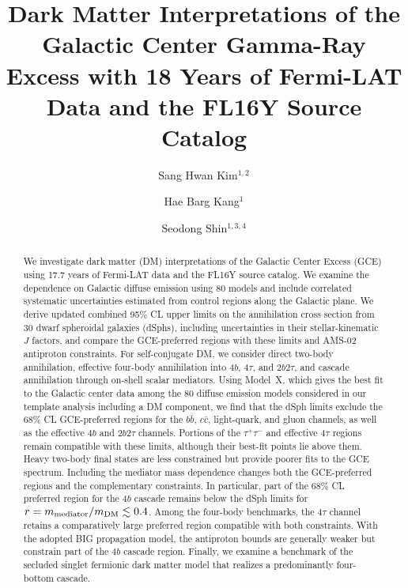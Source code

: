 \documentclass[superscriptaddress,
showpacs,preprintnumbers,nofootinbib,eqsecnum,amsmath,amssymb,aps,11pt, groupedaddress, floatfix]{revtex4-2}
\begin{document}


\title{\large \bf Dark Matter Interpretations of the Galactic Center Gamma-Ray Excess with 18 Years of Fermi-LAT Data and the FL16Y Source Catalog} 


\author{Sang Hwan Kim$^{1,2}$}

\author{Hae Barg Kang$^1$} 

\author{Seodong Shin$^{1,3,4}$}





\begin{abstract}
We investigate dark matter (DM) interpretations of the Galactic
Center Excess (GCE) using 17.7 years of Fermi-LAT data and the FL16Y source catalog. 
We examine the dependence on Galactic
diffuse emission using 80 models and include correlated systematic uncertainties estimated from control regions along the Galactic plane. 
We derive updated combined 95\% CL upper limits on the annihilation cross section from 30 dwarf spheroidal galaxies (dSphs), including uncertainties in their stellar-kinematic $J$ factors, and compare the GCE-preferred regions with these limits and AMS-02 antiproton constraints.
For self-conjugate DM, we consider direct two-body annihilation, effective four-body annihilation into $4b$, $4\tau$, and $2b2\tau$,
and cascade annihilation through on-shell scalar mediators.
Using Model~X, which gives the best fit to the Galactic center
data among the 80 diffuse emission models considered in our
template analysis including a DM component, we find that the
dSph limits exclude the 68\% CL GCE-preferred regions for the
$b\bar b$, $c\bar c$, light-quark, and gluon channels, as well
as the effective $4b$ and $2b2\tau$ channels.
Portions of the $\tau^+\tau^-$ and effective $4\tau$ regions remain compatible with these limits, although their best-fit points lie above them. Heavy two-body final states are less constrained but provide poorer fits to the GCE spectrum.
Including the mediator mass dependence changes both the
GCE-preferred regions and the complementary constraints.
In particular, part of the 68\% CL preferred region for the $4b$ cascade remains below the dSph limits for $r=m_{\rm mediator}/m_{\rm DM} \lesssim 0.4$.
Among the four-body benchmarks, the $4\tau$ channel retains a comparatively large preferred region compatible with both constraints. With the adopted BIG propagation model, the antiproton bounds are generally weaker but constrain part of the $4b$ cascade region. 
Finally, we examine a benchmark of the secluded singlet fermionic dark matter model that realizes a predominantly four-bottom cascade.
\end{abstract}
\end{document}
